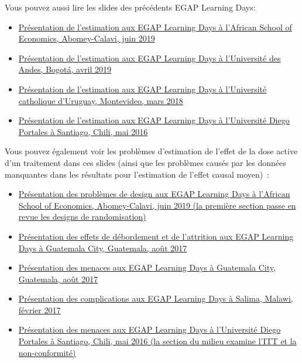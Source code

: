 \documentclass[
  12pt,
]{book}
\begin{document}
Vous pouvez aussi lire les slides des précédents EGAP Learning Days:

\begin{itemize}
\item
  \href{https://egap.github.io/learningdays-resources/Slides/Examples/estimation-benin.pdf}{Présentation de l'estimation aux EGAP Learning Days à l'African School of Economics, Abomey-Calavi, juin 2019}
\item
  \href{https://egap.github.io/learningdays-resources/Slides/Examples/estimation-bogota.pdf}{Présentation de l'estimation aux EGAP Learning Days à l'Université des Andes, Bogotá, avril 2019}
\item
  \href{https://egap.github.io/learningdays-resources/Slides/Examples/estimation-montevideo.pdf}{Présentation de l'estimation aux EGAP Learning Days à l'Université catholique d'Uruguay, Montevideo, mars 2018}
\item
  \href{https://egap.github.io/learningdays-resources/Slides/Examples/estimation-santiago.pdf}{Présentation de l'estimation aux EGAP Learning Days à l'Université Diego Portales à Santiago, Chili, mai 2016}
\end{itemize}

Vous pouvez également voir les problèmes d'estimation de l'effet de la dose active d'un traitement dans ces slides (ainsi que les problèmes causés par les données manquantes dans les résultats pour l'estimation de l'effet causal moyen)~:

\begin{itemize}
\item
  \href{https://egap.github.io/learningdays-resources/Slides/Examples/threats-benin.pdf}{Présentation des problèmes de design aux EGAP Learning Days à l'African School of Economics, Abomey-Calavi, juin 2019 (la première section passe en revue les designs de randomisation)}
\item
  \href{https://egap.github.io/learningdays-resources/Slides/Examples/spillovers_attrition-guatemala.pdf}{Présentation des effets de débordement et de l'attrition aux EGAP Learning Days à Guatemala City, Guatemala, août 2017}
\item
  \href{https://egap.github.io/learningdays-resources/Slides/Examples/threats-guatemala.pdf}{Présentation des menaces aux EGAP Learning Days à Guatemala City, Guatemala, août 2017}
\item
  \href{https://egap.github.io/learningdays-resources/Slides/Examples/complications-malawi.pdf}{Présentation des complications aux EGAP Learning Days à Salima, Malawi, février 2017}
\item
  \href{https://egap.github.io/learningdays-resources/Slides/Examples/threats-santiago.pdf}{Présentation des menaces aux EGAP Learning Days à l'Université Diego Portales à Santiago, Chili, mai 2016 (la section du milieu examine l'ITT et la non-conformité)}
\end{itemize}
\end{document}
